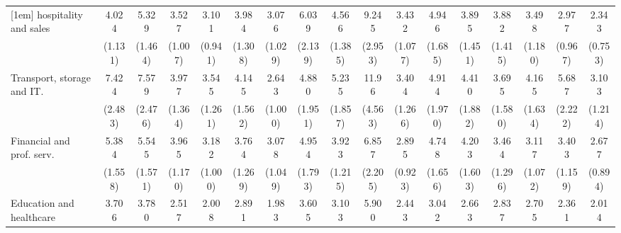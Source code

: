 {\begin{tabular}{l*{16}{c}}
[1em]
hospitality and sales&       4.024\sym{***}&       5.329\sym{***}&       3.527\sym{***}&       3.101\sym{***}&       3.984\sym{***}&       3.076\sym{***}&       6.039\sym{***}&       4.566\sym{***}&       9.245\sym{***}&       3.432\sym{***}&       4.946\sym{***}&       3.895\sym{***}&       3.882\sym{***}&       3.498\sym{***}&       2.977\sym{***}&       2.343\sym{**} \\
                    &     (1.131)         &     (1.464)         &     (1.007)         &     (0.941)         &     (1.308)         &     (1.029)         &     (2.139)         &     (1.385)         &     (2.953)         &     (1.077)         &     (1.685)         &     (1.451)         &     (1.415)         &     (1.180)         &     (0.967)         &     (0.753)         \\
[1em]
Transport, storage and IT.&       7.424\sym{***}&       7.579\sym{***}&       3.977\sym{***}&       3.545\sym{***}&       4.145\sym{***}&       2.643\sym{*}  &       4.880\sym{***}&       5.235\sym{***}&       11.96\sym{***}&       3.404\sym{***}&       4.914\sym{***}&       4.410\sym{***}&       3.695\sym{**} &       4.165\sym{***}&       5.687\sym{***}&       3.103\sym{**} \\
                    &     (2.483)         &     (2.476)         &     (1.364)         &     (1.261)         &     (1.562)         &     (1.000)         &     (1.951)         &     (1.857)         &     (4.563)         &     (1.266)         &     (1.970)         &     (1.882)         &     (1.580)         &     (1.634)         &     (2.222)         &     (1.214)         \\
[1em]
Financial and prof. serv.&       5.384\sym{***}&       5.545\sym{***}&       3.965\sym{***}&       3.182\sym{***}&       3.764\sym{***}&       3.078\sym{***}&       4.954\sym{***}&       3.923\sym{***}&       6.857\sym{***}&       2.895\sym{***}&       4.748\sym{***}&       4.203\sym{***}&       3.464\sym{***}&       3.117\sym{***}&       3.403\sym{***}&       2.677\sym{**} \\
                    &     (1.558)         &     (1.571)         &     (1.170)         &     (1.000)         &     (1.269)         &     (1.049)         &     (1.793)         &     (1.215)         &     (2.205)         &     (0.923)         &     (1.656)         &     (1.603)         &     (1.296)         &     (1.072)         &     (1.159)         &     (0.894)         \\
[1em]
Education and healthcare&       3.706\sym{***}&       3.780\sym{***}&       2.517\sym{**} &       2.008\sym{*}  &       2.891\sym{**} &       1.983\sym{*}  &       3.605\sym{***}&       3.103\sym{***}&       5.900\sym{***}&       2.443\sym{**} &       3.042\sym{**} &       2.663\sym{**} &       2.837\sym{**} &       2.705\sym{**} &       2.361\sym{*}  &       2.014\sym{*}  \\

\end{tabular}}
